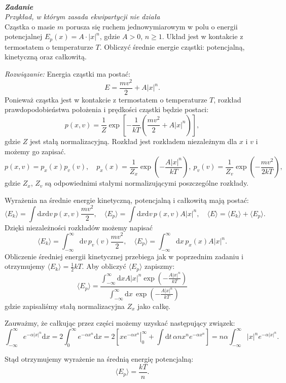 \documentclass[11pt,a4paper]{article}
\newcounter{zadanie}\newcommand{\zadanie}[1][]{\addtocounter{zadanie}{1} ~\\  {\bf \emph{Zadanie \arabic{zadanie} #1 }} \\}
\renewcommand{\t}[1]{\textrm{#1}}
\begin{document}
\newpage
\zadanie
{\em Przykład, w którym zasada ekwipartycji nie działa}\\
Cząstka o masie $m$ porusza się ruchem jednowymiarowym w polu o energii potencjalnej
$E_p(x) = A \cdot |x|^n$, gdzie $A>0$, $n\ge 1$.
Układ jest w kontakcie z termostatem o temperaturze $T$.
Obliczyć średnie energie cząstki: potencjalną, kinetyczną oraz całkowitą.
\newline

\emph{Rozwiązanie:}
Energia cząstki ma postać:
$$
E = \frac{m v^2}{2} + A |x|^n.
$$
Ponieważ cząstka jest w kontakcie z termostatem o temperaturze $T$, rozkład prawdopodobieństwa położenia i prędkości cząstki będzie
postaci:
$$
p(x,v) = \frac{1}{Z} \exp\left[ - \frac{1}{kT} \left(\frac{m v^2}{2} + A |x|^n \right)  \right],
$$
gdzie $Z$ jest stałą normalizacyjną.
Rozkład jest rozkładem niezależnym dla $x$ i $v$ i możemy go zapisać.
$$
p(x,v) = p_x(x) p_v(v), \quad p_x(x) = \frac{1}{Z_x} \exp\left( - \frac{A |x|^n}{kT}\right),
\ p_v(v) = \frac{1}{Z_v}\exp\left(- \frac{m v^2}{2 k T } \right),
$$
gdzie $Z_x$, $Z_v$ są odpowiednimi stałymi normalizującymi poszczególne rozkłady.

Wyrażenia na średnie energie kinetyczną, potencjalną i całkowitą mają postać:
$$
\langle E_k \rangle = \int \t{d} x \t{d}v \, p(x,v) \frac{m v^2}{2}, \quad  \langle E_p \rangle = \int \t{d} x \t{d}v \, p(x,v)
A |x|^n, \quad \langle E \rangle = \langle E_k \rangle + \langle E_p \rangle.
$$
Dzięki niezależności rozkładów możemy napisać
$$
\langle E_k \rangle = \int_{-\infty}^\infty \t{d}v \, p_v(v) \frac{m v^2}{2}, \quad  \langle E_p \rangle = \int_{-\infty}^\infty \t{d} x \, p_x(x)
A |x|^n.
$$
Obliczenie średniej energii kinetycznej przebiega jak w poprzednim zadaniu i otrzymujemy $\langle E_k\rangle = \frac{1}{2}k T$.
Aby obliczyć $\langle E_p \rangle$ zapiszmy:
$$
\langle E_p \rangle = \frac{\int_{-\infty}^\infty\t{d}x A |x|^n \exp\left( - \frac{A |x|^n}{kT} \right)}{\int_{-\infty}^\infty\t{d}x\,  \exp\left( - \frac{A |x|^n}{kT} \right)}
$$
gdzie zapisaliśmy stałą normalizacyjna $Z_x$ jako całkę.

Zauważmy, że całkując przez części możemy uzyskać następujący związek:
$$
\int_{-\infty}^\infty  e^{- \alpha |x|^n}\textrm{d}x = 2 \int_0^\infty  e^{- \alpha x^n}\textrm{d}x =
2\left[ \left.x  e^{- \alpha x^n}\right|_{0}^\infty +  \int\t{d}t\, \alpha n x^n e^{-\alpha x^n}\right] = n \alpha \int_{-\infty}^\infty |x|^n e^{-\alpha |x|^n}.
$$

Stąd otrzymujemy wyrażenie na średnią energię potencjalną:
$$
\langle E_p \rangle = \frac{k T}{n}.
$$
\end{document}
